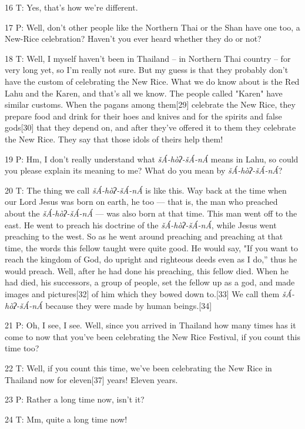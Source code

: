 {16 T: Yes, that's how we're different. }

{17 P: Well, don't other people like the Northern Thai or the Shan have
one too, a New-Rice celebration? Haven't you ever heard whether they do or not?
}

{18 T: Well, I myself haven't been in Thailand -- in Northern Thai country
-- for very long yet, so I'm really not sure. But my guess is that they probably
don't have the custom of celebrating the New Rice. What we do know about is the
Red Lahu and the Karen, and that's all we know. The people called "Karen"
have similar customs. When the pagans among them[29] celebrate the New Rice, they
prepare food and drink for their hoes and knives and for the spirits and false
gods[30] that they depend on, and after they've offered it to them they celebrate
the New Rice. They say that those idols of theirs help them! }

{19 P: Hm, I don't really understand what }{\textit{šÁ-hòʔ-šÁ-nÁ}}{
means in Lahu, so could you please explain its meaning to me? What do you mean
by }{\textit{šÁ-hòʔ-šÁ-nÁ}}{? }

{20 T: The thing we call }{\textit{šÁ-hòʔ-šÁ-nÁ }}{is
like this. Way back at the time when our Lord Jesus was born on earth, he too ---
that is, the man who preached about the }{\textit{šÁ-hòʔ-šÁ-nÁ}}{
--- was also born at that time. This man went off to the east. He went to preach
his doctrine of the }{\textit{šÁ-hòʔ-šÁ-nÁ}}{, while Jesus
went preaching to the west. So as he went around preaching and preaching at that
time, the words this fellow taught were quite good. He would say, "If
you want to reach the kingdom of God, do upright and righteous deeds even as I
do,'' thus he would preach. Well, after he had done his preaching, this fellow
died. When he had died, his successors, a group of people, set the fellow up as
a god, and made images and pictures[32] of him which they bowed down to.[33] We
call them }{\textit{šÁ-hòʔ-šÁ-nÁ}}{ because they were made
by human beings.[34]}

{21 P: Oh, I see, I see. Well, since you arrived in Thailand how many times
has it come to now that you've been celebrating the New Rice Festival, if you count
this time too?}

{22 T: Well, if you count this time, we've been celebrating the New Rice
in Thailand now for eleven[37] years! Eleven years.}

{23 P: Rather a long time now, isn't it?}

{24 T: Mm, quite a long time now! }

